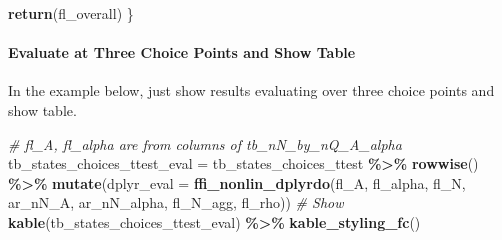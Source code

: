 \documentclass[
]{book}
\newenvironment{Shaded}{\begin{snugshade}}{\end{snugshade}}
\newcommand{\CommentTok}[1]{\textcolor[rgb]{0.56,0.35,0.01}{\textit{#1}}}
\newcommand{\DataTypeTok}[1]{\textcolor[rgb]{0.13,0.29,0.53}{#1}}
\newcommand{\KeywordTok}[1]{\textcolor[rgb]{0.13,0.29,0.53}{\textbf{#1}}}
\newcommand{\NormalTok}[1]{#1}
\newcommand{\OperatorTok}[1]{\textcolor[rgb]{0.81,0.36,0.00}{\textbf{#1}}}
\newcommand{\StringTok}[1]{\textcolor[rgb]{0.31,0.60,0.02}{#1}}
\begin{document}
\begin{Shaded}
\begin{Highlighting}[]
  \KeywordTok{return}\NormalTok{(fl\_overall)}
\NormalTok{\}}
\end{Highlighting}
\end{Shaded}

\hypertarget{evaluate-at-three-choice-points-and-show-table}{%
\paragraph{Evaluate at Three Choice Points and Show Table}\label{evaluate-at-three-choice-points-and-show-table}}

In the example below, just show results evaluating over three choice points and show table.

\begin{Shaded}
\begin{Highlighting}[]
\CommentTok{\# fl\_A, fl\_alpha are from columns of tb\_nN\_by\_nQ\_A\_alpha}
\NormalTok{tb\_states\_choices\_ttest\_eval =}\StringTok{ }\NormalTok{tb\_states\_choices\_ttest }\OperatorTok{\%\textgreater{}\%}\StringTok{ }\KeywordTok{rowwise}\NormalTok{() }\OperatorTok{\%\textgreater{}\%}
\StringTok{                        }\KeywordTok{mutate}\NormalTok{(}\DataTypeTok{dplyr\_eval =} \KeywordTok{ffi\_nonlin\_dplyrdo}\NormalTok{(fl\_A, fl\_alpha, fl\_N,}
\NormalTok{                                                               ar\_nN\_A, ar\_nN\_alpha,}
\NormalTok{                                                               fl\_N\_agg, fl\_rho))}
\CommentTok{\# Show}
\KeywordTok{kable}\NormalTok{(tb\_states\_choices\_ttest\_eval) }\OperatorTok{\%\textgreater{}\%}
\StringTok{  }\KeywordTok{kable\_styling\_fc}\NormalTok{()}
\end{Highlighting}
\end{Shaded}
\end{document}
